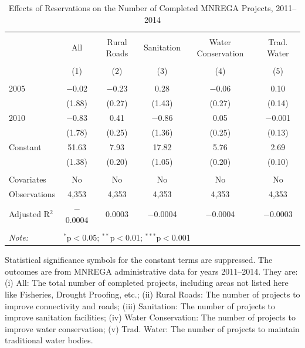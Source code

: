 \begin{table}[!htbp]
\centering
\begin{threeparttable}

  \caption{Effects of Reservations on the Number of Completed MNREGA Projects, 2011--2014} 
  \label{main_mnrega} 
\scriptsize 
\begin{tabular}{@{\extracolsep{0pt}}lccccc} 
\\[-1.8ex]\hline 
\hline \\[-1.8ex] 
 & All & Rural Roads & Sanitation & Water Conservation & Trad. Water \\ 
\\[-1.8ex] & (1) & (2) & (3) & (4) & (5)\\ 
\hline \\[-1.8ex] 
 2005 & $-$0.02 & $-$0.23 & 0.28 & $-$0.06 & 0.10 \\ 
  & (1.88) & (0.27) & (1.43) & (0.27) & (0.14) \\ 
  2010 & $-$0.83 & 0.41 & $-$0.86 & 0.05 & $-$0.001 \\ 
  & (1.78) & (0.25) & (1.36) & (0.25) & (0.13) \\ 
  Constant & 51.63 & 7.93 & 17.82 & 5.76 & 2.69 \\ 
  & (1.38) & (0.20) & (1.05) & (0.20) & (0.10) \\ 
 \hline \\[-1.8ex] 
Covariates & No & No & No & No & No \\ 
Observations & 4,353 & 4,353 & 4,353 & 4,353 & 4,353 \\ 
Adjusted R$^{2}$ & $-$0.0004 & 0.0003 & $-$0.0004 & $-$0.0004 & $-$0.0003 \\ 
\hline 
\hline \\[-1.8ex] 
\textit{Note:}  & \multicolumn{5}{l}{$^{*}$p$<$0.05; $^{**}$p$<$0.01; $^{***}$p$<$0.001} \\ 
\end{tabular} 
\begin{tablenotes}[flushleft]
\scriptsize
\item[] Statistical significance symbols for the constant terms are suppressed. The outcomes are from MNREGA administrative data for years 2011--2014. They are: 
(i) All: The total number of completed projects, including areas not listed here like Fisheries, Drought Proofing, etc.;
(ii) Rural Roads: The number of projects to improve connectivity and roads;
(iii) Sanitation: The number of projects to improve sanitation facilities;
(iv) Water Conservation: The number of projects to improve water conservation;
(v) Trad. Water: The number of projects to maintain traditional water bodies.
\end{tablenotes}
\end{threeparttable}
\end{table}
